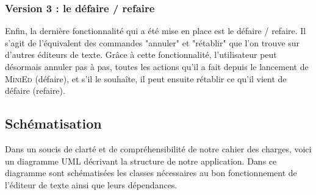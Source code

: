 \documentclass[a4paper]{article}
\begin{document}
			\subsubsection{Version 3 : le défaire / refaire}

			Enfin, la dernière fonctionnalité qui a été mise en place est le défaire / refaire. Il s'agit de l'équivalent des commandes "annuler" et "rétablir" que l'on trouve sur d'autres éditeurs de texte. Grâce à cette fonctionnalité, l'utilisateur peut désormais annuler pas à pas, toutes les actions qu'il a fait depuis le lancement de \textsc{MiniEd} (défaire), et s'il le souhaîte, il peut ensuite rétablir ce qu'il vient de défaire (refaire).

			\vspace{0.5cm}

		\subsection{Schématisation}

		\vspace{0.5cm}

		Dans un soucis de clarté et de compréhensibilité de notre cahier des charges, voici un diagramme UML décrivant la structure de notre application. Dans ce diagramme sont schématisées les classes nécessaires au bon fonctionnement de l’éditeur de texte ainsi que leurs dépendances.
\end{document}
